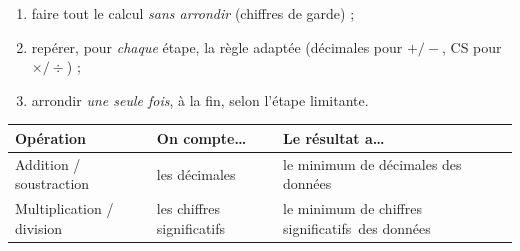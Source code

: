 \documentclass[11pt,a4paper]{article}
\newcommand{\CS}{chiffres significatifs}
\begin{document}
\begin{methode}
\begin{enumerate}[leftmargin=1.6em,topsep=1pt,itemsep=0pt]
  \item faire tout le calcul \emph{sans arrondir} (chiffres de garde) ;
  \item repérer, pour \emph{chaque} étape, la règle adaptée (décimales pour $+/-$, CS pour $\times/\div$) ;
  \item arrondir \emph{une seule fois}, à la fin, selon l'étape limitante.
\end{enumerate}
\end{methode}

\begin{center}\small
\renewcommand{\arraystretch}{1.15}
\begin{tabular}{@{}l l l@{}}
\toprule
\textbf{Opération} & \textbf{On compte\dots} & \textbf{Le résultat a\dots}\\
\midrule
Addition / soustraction   & les décimales & le minimum de décimales des données\\
Multiplication / division & les \CS       & le minimum de \CS\ des données\\
\bottomrule
\end{tabular}
\end{center}
\end{document}

